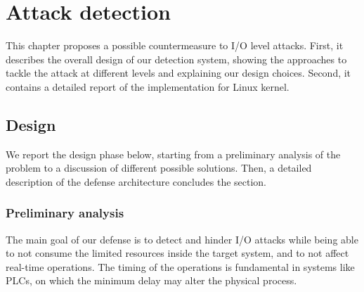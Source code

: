 \chapter{Attack detection}
\label{chap:defense}

This chapter proposes a possible countermeasure to I/O level attacks.
First, it describes the overall design of our detection system, showing the approaches to tackle the attack at different levels
and explaining our design choices. Second, it contains a detailed report of the implementation for Linux kernel.


\section{Design}
We report the design phase below, starting from a preliminary analysis of the problem to a discussion of different possible solutions.
Then, a detailed description of the defense architecture concludes the section.


\subsection{Preliminary analysis}
\label{sec:pre-analysis}

The main goal of our defense is to detect and hinder I/O attacks while being able to not consume the limited resources inside the target system,
and to not affect real-time operations. The timing of the operations is fundamental in systems like PLCs, on which the minimum delay may alter the physical process.

